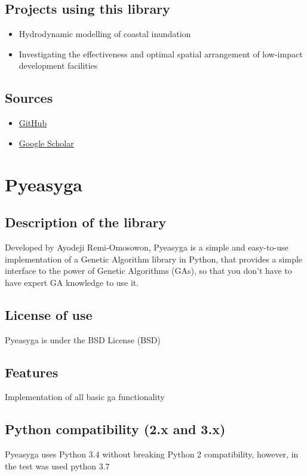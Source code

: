 \documentclass{article}
\begin{document}
	\subsection{Projects using this library}
	\begin{itemize}
		\item Hydrodynamic modelling of coastal inundation
		\item Investigating the effectiveness and optimal spatial         arrangement of low-impact development facilities
	\end{itemize}
	\subsection{Sources}
	\begin{itemize}
		\item \href{https://github.com/inspectorG4dget/Genetic-Framework/tree/master/pyvolution/Documentation}{GitHub}
		\item \href{https://scholar.google.com/scholar?hl=it&as_sdt=02C5&q=pyeasyga&btnG=}{Google Scholar}
	\end{itemize}
	
	\section{Pyeasyga}
	\subsection{Description of the library}
	Developed by Ayodeji Remi-Omosowon, Pyeasyga is a  simple and easy-to-use implementation of a Genetic Algorithm library in Python, that provides a simple interface to the power of Genetic Algorithms (GAs), so that you don’t have to have expert GA knowledge to use it. 
	\subsection{License of use}
	Pyeasyga is under the  BSD License (BSD)
	\subsection{Features}
	Implementation of all basic ga functionality
	\subsection{Python compatibility (2.x and 3.x)}
	Pyeasyga uses Python 3.4  without breaking Python 2 compatibility, however, in the test was used python 3.7
\end{document}
